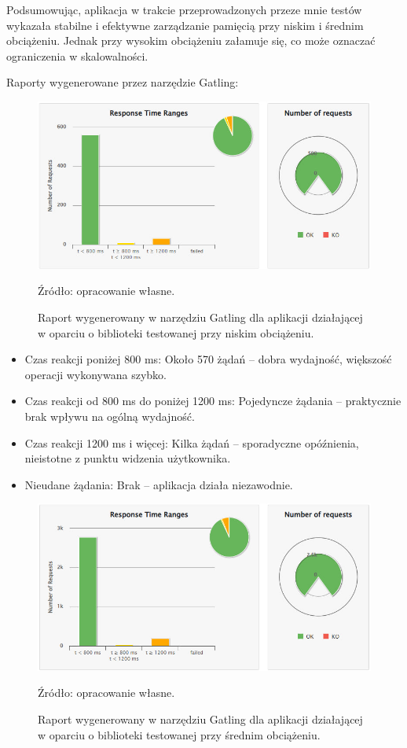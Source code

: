 \documentclass[runningheads,12pt]{llncs}
\begin{document}
Podsumowując, aplikacja w trakcie przeprowadzonych przeze mnie testów wykazała stabilne i efektywne zarządzanie pamięcią przy niskim i średnim obciążeniu. Jednak przy wysokim obciążeniu załamuje się, co może oznaczać ograniczenia w skalowalności.

\newpage

Raporty wygenerowane przez narzędzie Gatling:


\begin{figure}
    \centering
    \includegraphics[width=0.8\linewidth]{images/library-gatling-low-graph.jpg}
    \caption{Raport wygenerowany w narzędziu Gatling dla aplikacji działającej w oparciu o biblioteki testowanej przy niskim obciążeniu.}
    \vspace{0.5em}
    {\small Źródło: opracowanie własne.}
    \label{fig:low}
\end{figure}

\begin{itemize}
    \item Czas reakcji poniżej 800 ms: Około 570 żądań – dobra wydajność, większość operacji wykonywana szybko.
    \item Czas reakcji od 800 ms do poniżej 1200 ms: Pojedyncze żądania – praktycznie brak wpływu na ogólną wydajność.
    \item Czas reakcji 1200 ms i więcej: Kilka żądań – sporadyczne opóźnienia, nieistotne z punktu widzenia użytkownika.
    \item Nieudane żądania: Brak – aplikacja działa niezawodnie.
\end{itemize}

\newpage

\begin{figure}
    \centering
    \includegraphics[width=0.8\linewidth]{images/library-gatling-middle-graph.jpg}
    \caption{Raport wygenerowany w narzędziu Gatling dla aplikacji działającej w oparciu o biblioteki testowanej przy średnim obciążeniu.}
    \vspace{0.5em}
    {\small Źródło: opracowanie własne.}
    \label{fig:middle}
\end{figure}
\end{document}
